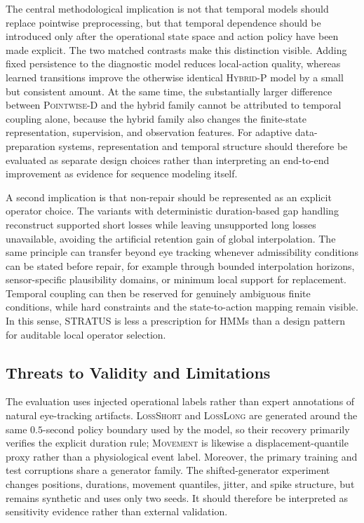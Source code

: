\documentclass[sigconf,review]{acmart}
\newcommand{\STRATUS}{\textsc{STRATUS}\xspace}
\newcommand{\methodP}{\textsc{Pointwise-D}\xspace}
\newcommand{\methodHP}{\textsc{Hybrid-P}\xspace}
\begin{document}
The central methodological implication is not that temporal models should replace pointwise preprocessing, but that temporal dependence should be introduced only after the operational state space and action policy have been made explicit. The two matched contrasts make this distinction visible. Adding fixed persistence to the diagnostic model reduces local-action quality, whereas learned transitions improve the otherwise identical \methodHP model by a small but consistent amount. At the same time, the substantially larger difference between \methodP and the hybrid family cannot be attributed to temporal coupling alone, because the hybrid family also changes the finite-state representation, supervision, and observation features. For adaptive data-preparation systems, representation and temporal structure should therefore be evaluated as separate design choices rather than interpreting an end-to-end improvement as evidence for sequence modeling itself.

A second implication is that non-repair should be represented as an explicit operator choice. The variants with deterministic duration-based gap handling reconstruct supported short losses while leaving unsupported long losses unavailable, avoiding the artificial retention gain of global interpolation. The same principle can transfer beyond eye tracking whenever admissibility conditions can be stated before repair, for example through bounded interpolation horizons, sensor-specific plausibility domains, or minimum local support for replacement. Temporal coupling can then be reserved for genuinely ambiguous finite conditions, while hard constraints and the state-to-action mapping remain visible. In this sense, \STRATUS is less a prescription for HMMs than a design pattern for auditable local operator selection.

\subsection{Threats to Validity and Limitations}

The evaluation uses injected operational labels rather than expert annotations of natural eye-tracking artifacts. \textsc{LossShort} and \textsc{LossLong} are generated around the same $0.5$-second policy boundary used by the model, so their recovery primarily verifies the explicit duration rule; \textsc{Movement} is likewise a displacement-quantile proxy rather than a physiological event label. Moreover, the primary training and test corruptions share a generator family. The shifted-generator experiment changes positions, durations, movement quantiles, jitter, and spike structure, but remains synthetic and uses only two seeds. It should therefore be interpreted as sensitivity evidence rather than external validation.
\end{document}
